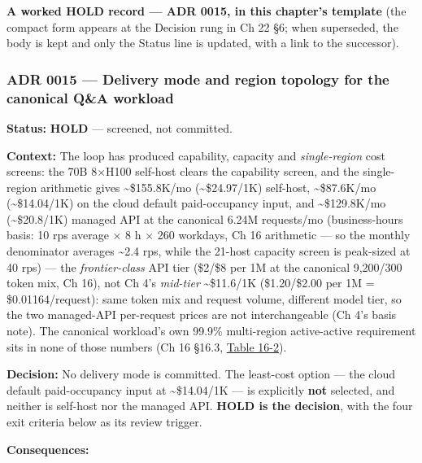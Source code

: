 \textbf{A worked HOLD record --- ADR 0015, in this chapter's template}
(the compact form appears at the Decision rung in Ch 22 §6; when
superseded, the body is kept and only the Status line is updated, with a
link to the successor).

\subsubsection*{ADR 0015 --- Delivery mode and region topology for the
canonical Q\&A
workload}\label{adr-0015-delivery-mode-and-region-topology-for-the-canonical-qa-workload}

\textbf{Status:} \textbf{HOLD} --- screened, not committed.

\textbf{Context:} The loop has produced capability, capacity and
\emph{single-region} cost screens: the 70B 8×H100 self-host clears the
capability screen, and the single-region arithmetic gives
\textasciitilde\$155.8K/mo (\textasciitilde\$24.97/1K) self-host,
\textasciitilde\$87.6K/mo (\textasciitilde\$14.04/1K) on the cloud
default paid-occupancy input, and \textasciitilde\$129.8K/mo
(\textasciitilde\$20.8/1K) managed API at the canonical 6.24M
requests/mo (business-hours basis: 10 rps average × 8 h × 260 workdays,
Ch 16 arithmetic --- so the monthly denominator averages
\textasciitilde2.4 rps, while the 21-host capacity screen is peak-sized
at 40 rps) --- the \emph{frontier-class} API tier (\$2/\$8 per 1M at the
canonical 9,200/300 token mix, Ch 16), not Ch 4's \emph{mid-tier}
\textasciitilde\$11.6/1K (\$1.20/\$2.00 per 1M = \$0.01164/request):
same token mix and request volume, different model tier, so the two
managed-API per-request prices are not interchangeable (Ch 4's basis
note). The canonical workload's own 99.9\% multi-region active-active
requirement sits in none of those numbers (Ch 16 §16.3, \hyperref[tab:16.2]{Table 16-2}).

\textbf{Decision:} No delivery mode is committed. The least-cost option
--- the cloud default paid-occupancy input at \textasciitilde\$14.04/1K
--- is explicitly \textbf{not} selected, and neither is self-host nor
the managed API. \textbf{HOLD is the decision}, with the four exit
criteria below as its review trigger.

\textbf{Consequences:}

